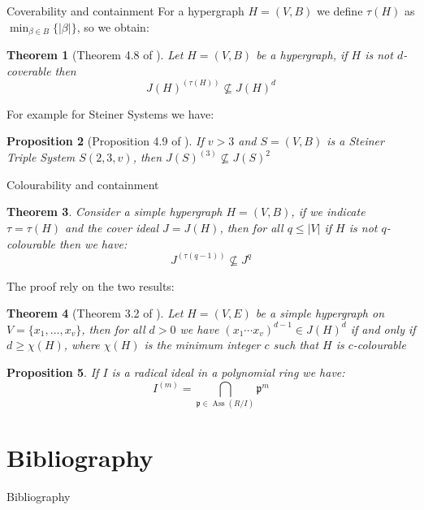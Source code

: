 \documentclass[dvipsnames]{beamer}
\theoremstyle{plain}
\newtheorem{teo}{Theorem}[section]
\newtheorem{prop}[teo]{Proposition}
\theoremstyle{remark}
\theoremstyle{definition}
\newcommand{\p}{\mathfrak{p}}
\newcommand{\mm}{\mathfrak{m}}
\DeclareMathOperator{\Ass}{Ass}
\begin{document}
\begin{frame}{Coverability and containment}
For a hypergraph $ H = (V,B) $ we define $ \tau (H) $ as $ \min_{\beta \in B} \{ |\beta |\}$, so we obtain:
\begin{teo}[Theorem 4.8 of \cite{Bal21Steiner}] \label{teo:col:cont}
Let $ H = (V,B) $ be a hypergraph, if $ H $ is not $ d $-coverable then 
\[ J(H)^{(\tau(H))} \not \subseteq J(H)^d \]
\end{teo}
For example for Steiner Systems we have:
\begin{prop}[Proposition 4.9 of \cite{Bal21Steiner}]
If $ v>3 $ and $ S = (V,B) $ is a Steiner Triple System $ S(2,3,v) $, then $ J(S)^{(3)}  \not \subseteq J(S)^2$
\end{prop}
\end{frame}

\begin{frame}{Colourability and containment}
\begin{teo} \label{teo:borin1}
	Consider a simple hypergraph $H = (V,B)$, if we indicate $\tau = \tau (H)$ and the cover ideal $ J = J(H)$,  then for all $ q \leq |V|$ if $ H $ is not $ q $-colourable then we have: 
 \[J^{( \tau(q-1) )} \not \subseteq J^q \]
\end{teo}
\end{frame}

\begin{frame}
The proof rely on the two results:
\begin{teo}[Theorem 3.2 of \cite{Fran10Colourings}] \label{teo:col:chi}
Let $ H = (V,E) $ be a simple hypergraph on $ V = \{ x_1 , ... , x_v\} $, then for all $ d >0 $ we have $ (x_1 \cdots x_v)^{d-1} \in J(H)^d $ if and only if $ d \geq \chi(H) $, where $ \chi(H) $ is the minimum integer $ c $ such that $ H $ is $ c $-colourable
\end{teo}
\begin{prop}\label{teo:sym_radical}
If $ I $ is a radical ideal in a polynomial ring we have:
\begin{equation}
		I^{(m)} = \bigcap_{\p \in \Ass(R/I) } \p^m
	\end{equation}
\end{prop}
\end{frame}

\section{Bibliography}
\begin{frame}[allowframebreaks]{Bibliography}
			\printbibliography[heading=none, notcategory=fullcited]	
\end{frame}
\end{document}

